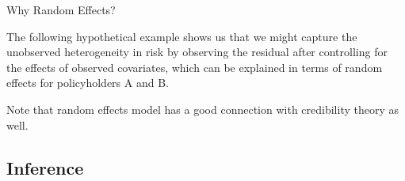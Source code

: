 \documentclass[ignorenonframetext,]{beamer}
\begin{document}
\begin{frame}{Why Random Effects?}

The following hypothetical example shows us that we might capture the
\color{purple} unobserved heterogeneity in risk \color{black} by
observing the residual after controlling for the effects of observed
covariates, which can be explained in terms of \color{purple} random
effects \color{black} for policyholders A and B.

\begin{table}[h!t!]
\centering
{}
\end{table}
Note that random effects model has a good connection with  \color{purple} credibility theory  \color{black} as well.
\end{frame}



\subsection{Inference}
\end{document}

